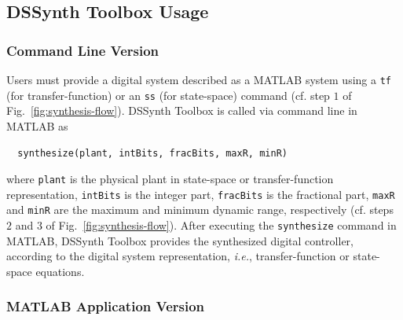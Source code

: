 \documentclass[sigconf]{acmart}
\newcommand\tool{{DSSynth Toolbox}\xspace}
\begin{document}
\subsection{\tool Usage}

\subsubsection{Command Line Version}

Users must provide a digital system described as a MATLAB system 
using a \texttt{tf} (for transfer-function) or an \texttt{ss} (for state-space) 
command (cf. step $1$ of Fig.~\ref{fig:synthesis-flow}).
\tool is called via command line in MATLAB as 

\begin{verbatim}  synthesize(plant, intBits, fracBits, maxR, minR) \end{verbatim} 

\noindent where \texttt{plant} is the physical plant in state-space or transfer-function representation, 
\texttt{intBits} is the integer part, \texttt{fracBits} is the fractional part, \texttt{maxR} and \texttt{minR} 
are the maximum and minimum dynamic range, respectively (cf. steps $2$ and $3$ of Fig.~\ref{fig:synthesis-flow}).
%
After executing the \texttt{synthesize} command in MATLAB, 
\tool provides the synthesized digital controller, according to 
the digital system representation, {\it i.e.}, transfer-function or 
state-space equations. 

\subsubsection{MATLAB Application Version} 
\end{document}

